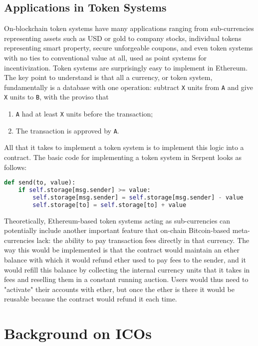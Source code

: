 \subsection{Applications in Token Systems}
On-blockchain token systems have many applications ranging from sub-currencies representing assets such as USD or gold to company stocks, individual tokens representing smart property, secure unforgeable coupons, and even token systems with no ties to conventional value at all, used as point systems for incentivization. \newline
Token systems are surprisingly easy to implement in Ethereum. The key point to understand is that all a currency, or token system, fundamentally is a database with one operation: subtract \texttt{X} units from \texttt{A} and give \texttt{X} units to \texttt{B}, with the proviso that 
\begin{enumerate}
    \item \texttt{A} had at least \texttt{X} units before the transaction;
    \item The transaction is approved by \texttt{A}.
\end{enumerate}

All that it takes to implement a token system is to implement this logic into a contract.
The basic code for implementing a token system in Serpent looks as follows:
\begin{lstlisting}[language=Python]
def send(to, value):
    if self.storage[msg.sender] >= value:
        self.storage[msg.sender] = self.storage[msg.sender] - value
        self.storage[to] = self.storage[to] + value
\end{lstlisting}

Theoretically, Ethereum-based token systems acting as sub-currencies can potentially include another important feature that on-chain Bitcoin-based meta-currencies lack: the ability to pay transaction fees directly in that currency. The way this would be implemented is that the contract would maintain an ether balance with which it would refund ether used to pay fees to the sender, and it would refill this balance by collecting the internal currency units that it takes in fees and reselling them in a constant running auction. Users would thus need to "activate" their accounts with ether, but once the ether is there it would be reusable because the contract would refund it each time.

\section{Background on ICOs}
\label{ico}
